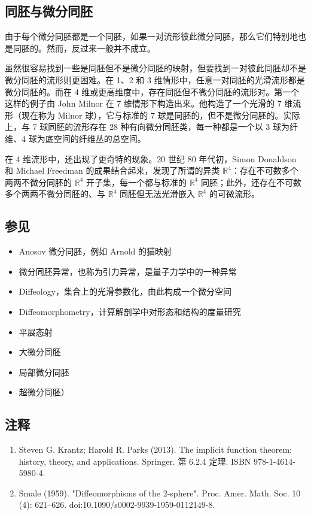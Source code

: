 \subsection{同胚与微分同胚}
由于每个微分同胚都是一个同胚，如果一对流形彼此微分同胚，那么它们特别地也是同胚的。然而，反过来一般并不成立。

虽然很容易找到一些是同胚但不是微分同胚的映射，但要找到一对彼此同胚却不是微分同胚的流形则更困难。在 1、2 和 3 维情形中，任意一对同胚的光滑流形都是微分同胚的。而在 4 维或更高维度中，存在同胚但不微分同胚的流形对。第一个这样的例子由 John Milnor 在 7 维情形下构造出来。他构造了一个光滑的 7 维流形（现在称为 Milnor 球），它与标准的 7 球是同胚的，但不是微分同胚的。实际上，与 7 球同胚的流形存在 28 种有向微分同胚类，每一种都是一个以 3 球为纤维、4 球为底空间的纤维丛的总空间。

在 4 维流形中，还出现了更奇特的现象。20 世纪 80 年代初，Simon Donaldson 和 Michael Freedman 的成果结合起来，发现了所谓的异类 $\mathbb{R}^4$：存在不可数多个两两不微分同胚的 $\mathbb{R}^4$ 开子集，每一个都与标准的 $\mathbb{R}^4$ 同胚；此外，还存在不可数多个两两不微分同胚的、与 $\mathbb{R}^4$ 同胚但无法光滑嵌入 $\mathbb{R}^4$ 的可微流形。

\subsection{参见}
\begin{itemize}
\item Anosov 微分同胚，例如 Arnold 的猫映射
\item 微分同胚异常，也称为引力异常，是量子力学中的一种异常
\item Diffeology，集合上的光滑参数化，由此构成一个微分空间
\item Diffeomorphometry，计算解剖学中对形态和结构的度量研究
\item 平展态射
\item 大微分同胚
\item 局部微分同胚
\item 超微分同胚）
\end{itemize}
\subsection{注释}
\begin{enumerate}
\item Steven G. Krantz; Harold R. Parks (2013). The implicit function theorem: history, theory, and applications. Springer. 第 6.2.4 定理. ISBN 978-1-4614-5980-4.
\item Smale (1959). "Diffeomorphisms of the 2-sphere". Proc. Amer. Math. Soc. 10 (4): 621–626. doi:10.1090/s0002-9939-1959-0112149-8.
\end{enumerate}
